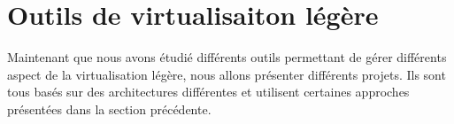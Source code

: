 \section{Outils de virtualisaiton légère}
\label{section:sota}

Maintenant que nous avons étudié différents outils permettant de gérer différents aspect de la virtualisation légère, nous allons présenter différents projets. Ils sont tous basés sur des architectures différentes et utilisent certaines approches présentées dans la section précédente.
